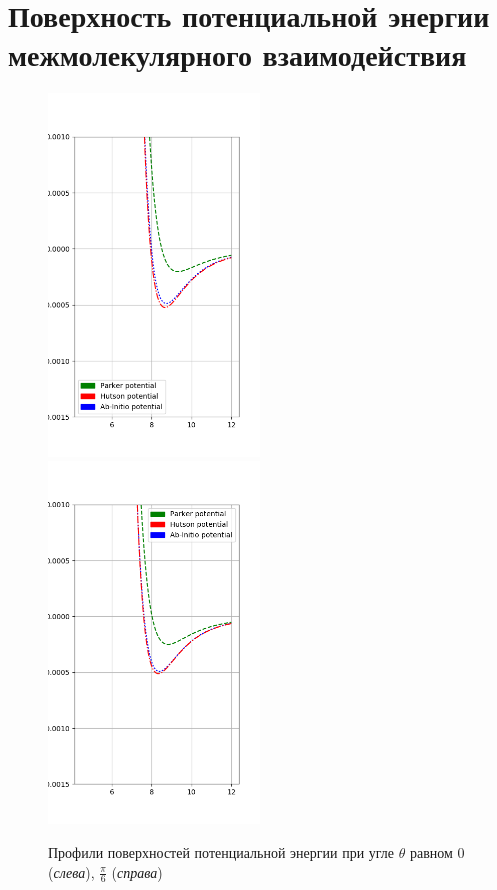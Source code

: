\section{Поверхность потенциальной энергии межмолекулярного взаимодействия}

\begin{figure}[!h]
	\includegraphics[width=0.5\textwidth]{pictures/potential_profiles_0.png} \quad  
	\includegraphics[width=0.5\textwidth]{pictures/potential_profiles_pi6.png} 
	\caption{Профили поверхностей потенциальной энергии при угле $\theta$ равном $0$ (\textit{слева}), $\frac{\pi}{6}$ (\textit{справа})} 
\end{figure}

